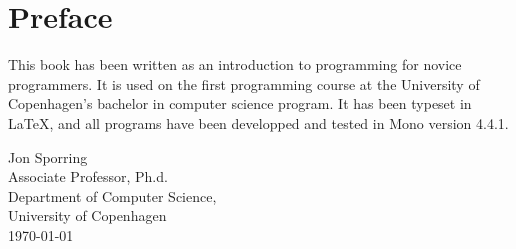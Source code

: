 \chapter{Preface}
This book has been written as an introduction to programming for novice programmers. It is used on the first programming course at the University of Copenhagen's bachelor in computer science program. It has been typeset in \LaTeX, and all programs have been developped and tested in Mono version 4.4.1.

\vspace*{1cm}
Jon Sporring\\
Associate Professor, Ph.d.\\
Department of Computer Science,\\
University of Copenhagen\\
\today\\

